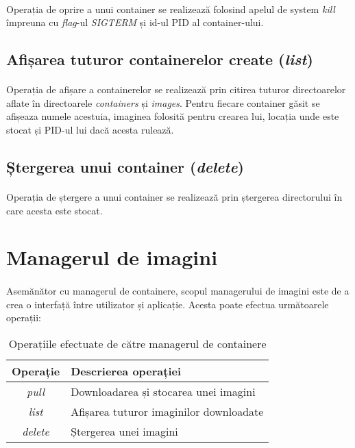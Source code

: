             \paragraph{} Operația de oprire a unui container se realizează folosind apelul de system \textit{kill} împreuna cu \textit{flag}-ul \textit{SIGTERM} și id-ul PID al container-ului.

        \subsection{Afișarea tuturor containerelor create (\textit{list})}
            \paragraph{} Operația de afișare a containerelor se realizează prin citirea tuturor directoarelor aflate în directoarele \textit{containers} și \textit{images}. Pentru fiecare container găsit se afișeaza numele acestuia, imaginea folosită pentru crearea lui, locația unde este stocat și PID-ul lui dacă acesta rulează.

        \subsection{Ștergerea unui container (\textit{delete})}
        \paragraph{} Operația de ștergere a unui container se realizează prin ștergerea directorului în care acesta este stocat.

    \section{Managerul de imagini}
        \paragraph{} Asemănător cu managerul de containere, scopul managerului de imagini este de a crea o interfață între utilizator și aplicație. Acesta poate efectua următoarele operații:
        \begin{table}[h!]
            \centering
            \begin{tabular}{ |c|l| }
                \hline
                \textbf{Operație} & \textbf{Descrierea operației}  \\
                \hline
                \textit{pull}   & Downloadarea și stocarea unei imagini  \\
                \hline
                \textit{list}   & Afișarea tuturor imaginilor downloadate  \\
                \hline
                \textit{delete} & Ștergerea unei imagini  \\
                \hline
            \end{tabular}
            \caption{Operațiile efectuate de către managerul de containere}
            \label{table:cmop}
        \end{table}

